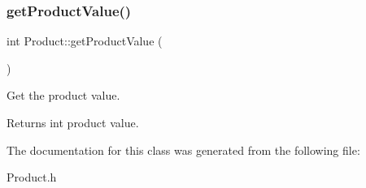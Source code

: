 \subsubsection{\texorpdfstring{get\+Product\+Value()}{getProductValue()}}
{\footnotesize\ttfamily int Product\+::get\+Product\+Value (\begin{DoxyParamCaption}{ }\end{DoxyParamCaption})}

Get the product value. \begin{DoxyReturn}{Returns}
int product value. 
\end{DoxyReturn}


The documentation for this class was generated from the following file\+:\begin{DoxyCompactItemize}
\item 
Product.\+h\end{DoxyCompactItemize}
